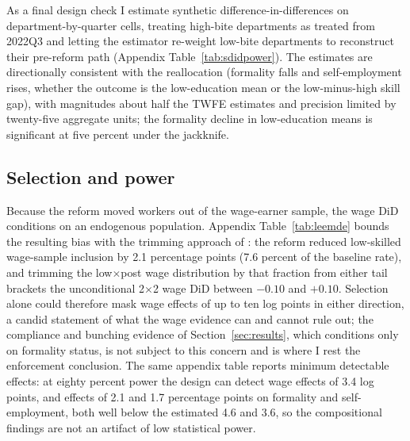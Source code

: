 As a final design check I estimate synthetic difference-in-differences
\citep{arkhangelsky_2021_sdid} on department-by-quarter cells, treating high-bite
departments as treated from 2022Q3 and letting the estimator re-weight low-bite
departments to reconstruct their pre-reform path (Appendix
Table~\ref{tab:sdidpower}). The estimates are directionally consistent with the
reallocation (formality falls and self-employment rises, whether the outcome is the
low-education mean or the low-minus-high skill gap), with magnitudes about half the
TWFE estimates and precision limited by twenty-five aggregate units; the formality
decline in low-education means is significant at five percent under the jackknife.

\subsection{Selection and power}

Because the reform moved workers out of the wage-earner sample, the wage DiD
conditions on an endogenous population. Appendix Table~\ref{tab:leemde} bounds the
resulting bias with the trimming approach of \citet{lee_2009}: the reform reduced
low-skilled wage-sample inclusion by 2.1 percentage points (7.6 percent of the
baseline rate), and trimming the low$\times$post wage distribution by that fraction
from either tail brackets the unconditional 2$\times$2 wage DiD between $-0.10$ and
$+0.10$. Selection alone could therefore mask wage effects of up to ten log points in
either direction, a candid statement of what the wage evidence can and cannot rule
out; the compliance and bunching evidence of Section~\ref{sec:results}, which
conditions only on formality status, is not subject to this concern and is where I
rest the enforcement conclusion. The same appendix table reports minimum detectable
effects: at eighty percent power the design can detect wage effects of 3.4 log
points, and effects of 2.1 and 1.7 percentage points on formality and
self-employment, both well below the estimated 4.6 and 3.6, so the compositional
findings are not an artifact of low statistical power.

